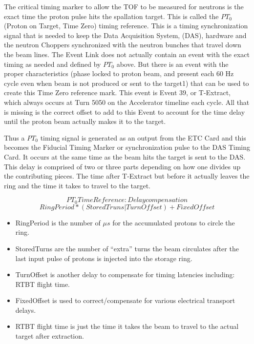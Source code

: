 The critical timing marker to allow the TOF to be measured for neutrons is the exact time the proton pulse hits the spallation target.  This is called the $PT_{0}$ (Proton on Target, Time Zero) timing reference.  This is a timing synchronization signal that is needed to keep the Data Acquisition System, (DAS), hardware and the neutron Choppers synchronized with the neutron bunches that travel down the beam lines.  The Event Link does not actually contain an event with the exact timing as needed and defined by $PT_{0}$ above.  But there is an event with the proper characteristics (phase locked to proton beam, and present each 60 Hz cycle even when beam is not produced or sent to the target1)  that can be used to create this Time Zero reference mark.   This event is Event 39, or T-Extract, which always occurs at Turn 5050 on the Accelerator timeline each cycle.  All that is missing is the correct offset to add to this Event to account for the time delay until the proton beam actually makes it to the target. 

Thus a  $PT_{0}$  timing signal is generated as an output from the ETC Card and this becomes the  Fiducial Timing Marker or synchronization pulse to the DAS Timing Card.  It occurs at the same time as the beam hits the target is sent to the DAS.   This delay is comprised of two or three parts depending on how one divides up the contributing pieces.  The time after T-Extract but before it actually leaves the ring and the time it takes to travel to the target.

$$PT_{0} Time Reference: Delay compensation$$
$$RingPeriod*(StoredTruns | TurnOffset) + FixedOffset$$

\begin{itemize}
\item
RingPeriod is the number of ${\mu}s$ for the accumulated protons to circle the ring.
\item
StoredTurns are the number of ``extra'' turns the beam circulates after the last input pulse of protons is injected into the storage ring.
\item
TurnOffset is another delay to compensate for timing latencies including: RTBT flight time.
\item
FixedOffset is used to correct/compensate for various electrical transport delays.
\item
RTBT flight time is just the time it takes the beam to travel to the actual target after extraction.  
\end{itemize}

